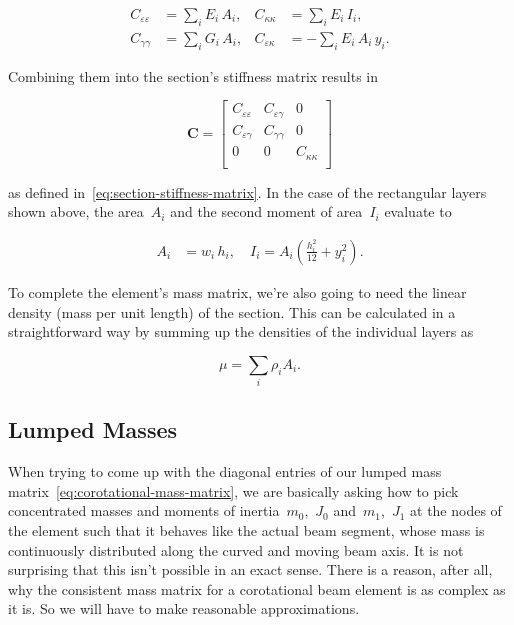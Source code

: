 \begin{align}
C_{\varepsilon\varepsilon} &= \sum_i E_i\,A_i, & C_{\kappa\kappa} &= \sum_i E_i\,I_{i}, \\
C_{\gamma\gamma} &= \sum_i G_i\,A_i, & C_{\varepsilon\kappa} &= -\sum_i E_i\,A_i\,y_i.
\end{align}

Combining them into the section's stiffness matrix results in

\begin{equation}
\boldsymbol{C} =
\begin{bmatrix}
C_{\varepsilon\varepsilon} & C_{\varepsilon\gamma} & 0 \\
C_{\varepsilon\gamma} & C_{\gamma\gamma} & 0 \\
0 & 0 & C_{\kappa\kappa} \\
\end{bmatrix}
\label{eq:section-stiffness-matrix-analytic}
\end{equation}

as defined in~\eqref{eq:section-stiffness-matrix}.
In the case of the rectangular layers shown above, the area~$A_i$ and the second moment of area~$I_i$ evaluate to

\begin{align}
A_i &= w_i\,h_i, \quad I_i = A_i\left(\frac{h_i^2}{12} + y_i^2\right).
\end{align}

To complete the element's mass matrix, we're also going to need the linear density (mass per unit length) of the section.
This can be calculated in a straightforward way by summing up the densities of the individual layers as

\begin{equation}
\mu = \sum_i \rho_i A_i.\label{eq:beam-linear-density}
\end{equation}

\newpage
\subsection{Lumped Masses}

When trying to come up with the diagonal entries of our lumped mass matrix~\eqref{eq:corotational-mass-matrix}, we are basically asking how to pick concentrated masses and moments of inertia~$m_0$,~$J_0$ and~$m_1$,~$J_1$ at the nodes of the element such that it behaves like the actual beam segment, whose mass is continuously distributed along the curved and moving beam axis.
It is not surprising that this isn't possible in an exact sense.
There is a reason, after all, why the consistent mass matrix for a corotational beam element is as complex as it is.
So we will have to make reasonable approximations.

